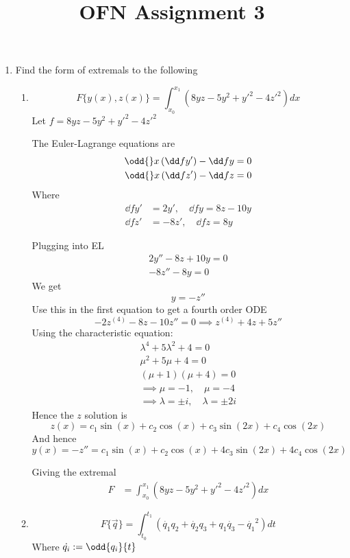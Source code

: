 \documentclass{X:/Documents/Coding/Latex/myassignment}
\title{OFN Assignment 3}
\begin{document}

\maketitle

\begin{enumerate}
\item Find the form of extremals to the following
\begin{enumerate}
	\item  
	\[F\{y(x),z(x)\} = \int_{x_0}^{x_1} (8yz - 5y^2 + y'^2 - 4z'^2) dx\]
	Let $f =  8yz - 5y^2 + y'^2 - 4z'^2 $


	The Euler-Lagrange equations are
	\begin{align*}
		\odd{}x \left(\dd f{y'}\right) - \dd fy =0 \\
		\odd{}x \left(\dd f{z'}\right) - \dd fz =0 \\
	\end{align*}
	Where
	\begin{align*}
		\dd f{y'} &= 2y', \quad \dd fy =8z - 10y\\
		\dd f{z'} &= -8z', \quad \dd fz =8y
	\end{align*} 

	Plugging into EL
	\begin{align*}
		2y'' - 8z + 10y = 0\\
		-8z'' - 8y = 0
	\end{align*}
	We get
	\[y = -z''\]
	Use this in the first equation to get a fourth order ODE
	\[-2 z^{(4)} - 8z - 10z'' = 0 \implies z^{(4)} + 4z + 5 z''\]
	Using the characteristic equation:
	\begin{align*}
		\lambda^{4}  + 5\lambda^{2} + 4 = 0\\
		\mu^2 + 5\mu + 4 = 0\\
		(\mu +1)(\mu + 4) = 0\\
		\implies \mu = -1, \quad \mu = -4\\
		\implies \lambda = \pm i, \quad \lambda = \pm 2i
	\end{align*}
	Hence the $z$ solution is
	\[\boxed{z(x) = c_1\sin(x) + c_2\cos(x) + c_3 \sin(2x) + c_4 \cos(2x) }\]
	And hence
	\[\boxed{y(x) = -z'' = c_1\sin(x) + c_2\cos(x) + 4c_3\sin(2x) + 4c_4\cos(2x)}\]
	
	Giving the extremal
	\begin{align*}
		F &= \int_{x_0}^{x_1} (8yz - 5y^2 + y'^2 - 4z'^2) dx
	\end{align*}

	\item 
	\[F\{\vec q\} = \int_{t_0}^{t_1} \left(\dot{q_1} q_2 + \dot{q_2} q_3 + q_1 \dot{q_3} - \dot{q_1}^2\right) dt\]
	Where $\dot{q_i} := \odd{q_i}{t} $


\end{enumerate}
\end{enumerate}
\end{document}
